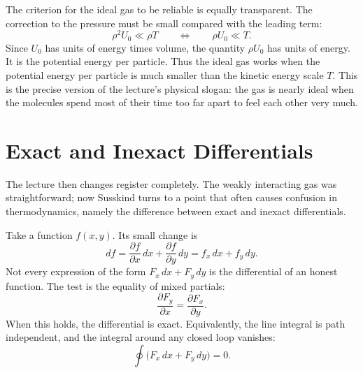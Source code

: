 The criterion for the ideal gas to be reliable is equally transparent. The correction to the pressure must be small compared with the leading term:
\begin{equation}
\rho^2 U_0 \ll \rho T
\qquad \Longleftrightarrow \qquad
\rho U_0 \ll T.
\end{equation}
Since \(U_0\) has units of energy times volume, the quantity \(\rho U_0\) has units of energy. It is the potential energy per particle. Thus the ideal gas works when the potential energy per particle is much smaller than the kinetic energy scale \(T\). This is the precise version of the lecture's physical slogan: the gas is nearly ideal when the molecules spend most of their time too far apart to feel each other very much.

\section{Exact and Inexact Differentials}

The lecture then changes register completely. The weakly interacting gas was straightforward; now Susskind turns to a point that often causes confusion in thermodynamics, namely the difference between exact and inexact differentials.

Take a function \(f(x,y)\). Its small change is
\begin{equation}
df=\frac{\partial f}{\partial x}\,dx+\frac{\partial f}{\partial y}\,dy
=f_x\,dx+f_y\,dy.
\end{equation}
Not every expression of the form \(F_x\,dx+F_y\,dy\) is the differential of an honest function. The test is the equality of mixed partials:
\begin{equation}
\frac{\partial F_y}{\partial x}=\frac{\partial F_x}{\partial y}.
\end{equation}
When this holds, the differential is exact. Equivalently, the line integral is path independent, and the integral around any closed loop vanishes:
\begin{equation}
\oint \bigl(F_x\,dx+F_y\,dy\bigr)=0.
\end{equation}

